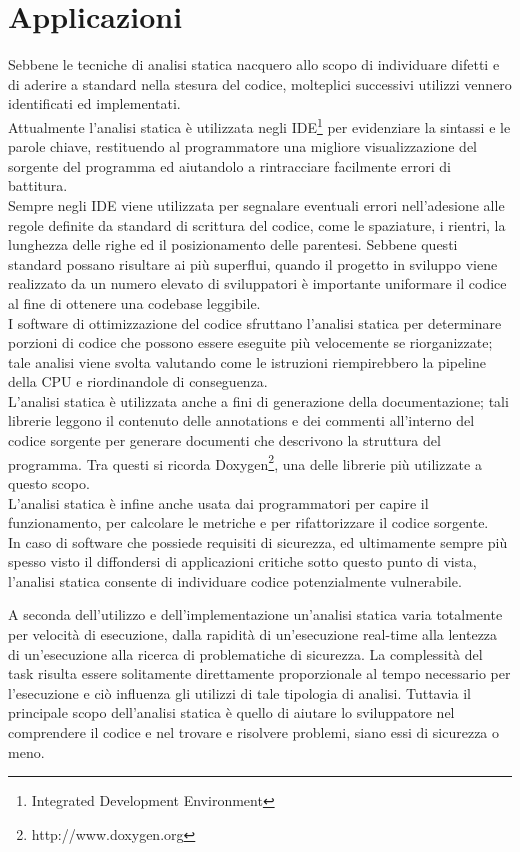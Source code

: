 \section{Applicazioni}
Sebbene le tecniche di analisi statica nacquero allo scopo di individuare difetti e di aderire a standard nella stesura del codice, molteplici successivi utilizzi vennero identificati ed implementati. \\
Attualmente l'analisi statica è utilizzata negli IDE\footnote{Integrated Development Environment} per evidenziare la sintassi e le parole chiave, restituendo al programmatore una migliore visualizzazione del sorgente del programma ed aiutandolo a rintracciare facilmente errori di battitura.\\
Sempre negli IDE viene utilizzata per segnalare eventuali errori nell'adesione alle regole definite da standard di scrittura del codice, come le spaziature, i rientri, la lunghezza delle righe ed il posizionamento delle parentesi. Sebbene questi standard possano risultare ai più superflui, quando il progetto in sviluppo viene realizzato da un numero elevato di sviluppatori è importante uniformare il codice al fine di ottenere una codebase leggibile.\\
I software di ottimizzazione del codice sfruttano l'analisi statica per determinare porzioni di codice che possono essere eseguite più velocemente se riorganizzate; tale analisi viene svolta valutando come le istruzioni riempirebbero la pipeline della CPU e riordinandole di conseguenza.\\
L'analisi statica è utilizzata anche a fini di generazione della documentazione; tali librerie leggono il contenuto delle annotations e dei commenti all'interno del codice sorgente per generare documenti che descrivono la struttura del programma. Tra questi si ricorda Doxygen\footnote{http://www.doxygen.org}, una delle librerie più utilizzate a questo scopo.\\
L'analisi statica è infine anche usata dai programmatori per capire il funzionamento, per calcolare le metriche e per rifattorizzare il codice sorgente.\\
In caso di software che possiede requisiti di sicurezza, ed ultimamente sempre più spesso visto il diffondersi di applicazioni critiche sotto questo punto di vista, l'analisi statica consente di individuare codice potenzialmente vulnerabile.

A seconda dell'utilizzo e dell'implementazione un'analisi statica varia totalmente per velocità di esecuzione, dalla rapidità di un'esecuzione real-time alla lentezza di un'esecuzione alla ricerca di problematiche di sicurezza. La complessità del task risulta essere solitamente direttamente proporzionale al tempo necessario per l'esecuzione e ciò influenza gli utilizzi di tale tipologia di analisi. Tuttavia il principale scopo dell'analisi statica è quello di aiutare lo sviluppatore nel comprendere il codice e nel trovare e risolvere problemi, siano essi di sicurezza o meno.

